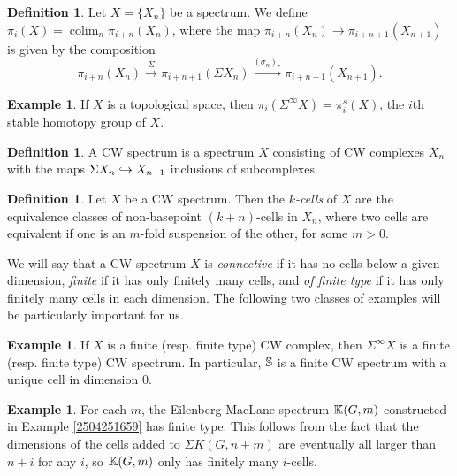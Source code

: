 \documentclass[11pt, titlepage]{article} %
\def\bb{\ensuremath\mathbb}
\def\inj{\ensuremath\hookrightarrow}
\DeclareMathOperator{\colim}{colim}
\numberwithin{equation}{subsection}
\theoremstyle{plain}
\theoremstyle{definition}
\newtheorem{definition}[theorem]{Definition}
\newtheorem{example}[theorem]{Example}
\begin{document}

\begin{definition}
Let \(X=\{X_n\}\) be a spectrum. We define \(\pi_i(X)=\colim_n \pi_{i+n}(X_n)\), where the map \(\pi_{i+n}(X_n)\to \pi_{i+n+1}(X_{n+1})\) is given by the composition
\[\pi_{i+n}(X_n)\xrightarrow{\Sigma}\pi_{i+n+1}(\Sigma X_n)\xrightarrow{(\sigma_n)_*}\pi_{i+n+1}(X_{n+1}).\]
\end{definition}

\begin{example}
If \(X\) is a topological space, then \(\pi_i(\Sigma^\infty X)=\pi_i^s(X)\), the \(i\)th stable homotopy group of \(X\). 
\end{example}

\begin{definition}
A CW spectrum is a spectrum \(X\) consisting of CW complexes \(X_n\) with the maps \(\Sigma X_n \inj X_{n+1}\) inclusions of subcomplexes. 
\end{definition}

\begin{definition}
Let \(X\) be a CW spectrum. Then the \textit{\(k\)-cells} of \(X\) are the equivalence classes of non-basepoint \((k+n)\)-cells in \(X_n\), where two cells are equivalent if one is an \(m\)-fold suspension of the other, for some \(m>0\). 
\end{definition}

We will say that a CW spectrum \(X\) is \textit{connective} if it has no cells below a given dimension, \textit{finite} if it has only finitely many cells, and \textit{of finite type} if it has only finitely many cells in each dimension. The following two classes of examples will be particularly important for us.

\begin{example}
If \(X\) is a finite (resp. finite type) CW complex, then \(\Sigma^\infty X\) is a finite (resp. finite type) CW spectrum. In particular, \(\bb{S}\) is a finite CW spectrum with a unique cell in dimension 0.
\end{example}

\begin{example}\label{2504251704}
For each \(m\), the Eilenberg-MacLane spectrum \(\bb{K}(G, m)\) constructed in Example \ref{2504251659} has finite type. This follows from the fact that the dimensions of the cells added to \(\Sigma K(G,n+m)\) are eventually all larger than \(n+i\) for any \(i\), so \(\bb{K}(G, m)\) only has finitely many \(i\)-cells. 
\end{example}
\end{document}
